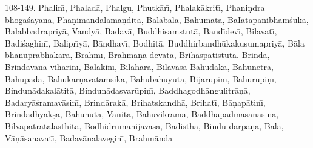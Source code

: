 108-149. Phalin\={\i}, Phalad\=a, Phalgu, Phutk\=ar\={\i}, Phalak\=akrit\={\i}, Phani\d{n}dra bhoga\'sayan\=a, Pha\d{n}imandalama\d{n}dit\=a, B\=alab\=al\=a, Bahumat\=a, B\=aI\=atapanibh\=am\'suk\=a, Balabbadrapriy\=a, Vandy\=a, Badav\=a, Buddhisamstut\=a, Band\={\i}dev\={\i}, Bilavat\={\i}, Badi\'saghin\={\i}, Balipr\={\i}y\=a, B\=andhav\={\i}, Bodhit\=a, Buddhirbandh\=ukakusumapriy\=a, B\=ala bh\=anuprabh\=ak\=ar\=a, Br\=ahm\={\i}, Br\=ahma\d{n}a devat\=a, Brihaspatistut\=a. Brind\=a, Brindavana vih\=arin\={\i}, B\=al\=akin\={\i}, Bil\=ah\=ara, Bilavas\=a Bah\=udak\=a, Bahunetr\=a, Bahupad\=a, Bahukar\d{n}\=avatamsik\=a, Bahub\=ahuyut\=a, Bijar\=upin\={\i}, Bahur\=upi\d{n}\={\i}, Bindun\=adakal\=atit\=a, Bindun\=adasvar\=upi\d{n}\={\i}, Baddhagodh\=angulitr\=a\d{n}\=a, Badary\=a\'sramav\=asin\={\i}, Brind\=arak\=a, Brihatskandh\=a, Brihat\={\i}, B\=a\d{n}ap\=atin\={\i}, Brind\=adhyak\d{s}\=a, Bahunut\=a, Vanit\=a, Bahuvikram\=a, Baddhapadm\=asan\=as\={\i}na, Bilvapatratalasthit\=a, Bodhidrumanij\=av\=as\=a, Badisth\=a, Bindu darpa\d{n}\=a, B\=al\=a, V\=a\d{n}\=asanavat\={\i}, Badav\=analavegin\={\i}, Brahm\=anda

